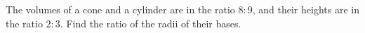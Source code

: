 The volumes of a cone and a cylinder are in the ratio $8:9$, and their heights are in the ratio $2:3$. Find the ratio of the radii of their bases.
